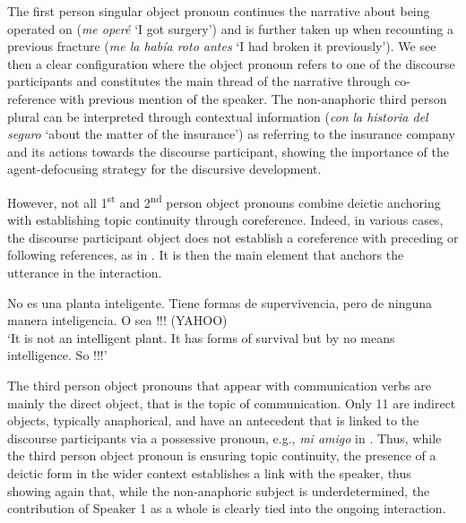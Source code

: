 \documentclass[output=paper]{langscibook}
\begin{document}
The first person singular object pronoun continues the narrative about being operated on (\textit{me operé} ‘I got surgery’) and is further taken up when recounting a previous fracture (\textit{me la había roto antes} ‘I had broken it previously’). We see then a clear configuration where the object pronoun refers to one of the discourse participants and constitutes the main thread of the narrative through co-reference with previous mention of the speaker. The non-anaphoric third person plural can be interpreted through contextual information (\textit{con} \textit{la historia del seguro} ‘about the matter of the insurance’) as referring to the insurance company and its actions towards the discourse participant, showing the importance of the agent-defocusing strategy for the discursive development.


However, not all 1\textsuperscript{st} and 2\textsuperscript{nd} person object pronouns combine deictic anchoring with establishing topic continuity through coreference. Indeed, in various cases, the discourse participant object does not establish a coreference with preceding or following references, as in . It is then the main element that anchors the utterance in the interaction.

\ea\label{ex:pierre:18}
{{No es una planta inteligente. Tiene formas de supervivencia, pero de ninguna manera inteligencia. O sea} }{}{!!! }{(YAHOO)}\\
\glt ‘It is not an intelligent plant. It has forms of survival but by no means intelligence. So    !!!’\\
\z 

The third person object pronouns that appear with communication verbs are mainly the direct object, that is the topic of communication. Only 11 are indirect objects, typically anaphorical, and have an antecedent that is linked to the discourse participants via a possessive pronoun, e.g., \textit{mi amigo} in . Thus, while the third person object pronoun is ensuring topic continuity, the presence of a deictic form in the wider context establishes a link with the speaker, thus showing again that, while the non-anaphoric subject is underdetermined, the contribution of Speaker 1 as a whole is clearly tied into the ongoing interaction.
\end{document}
